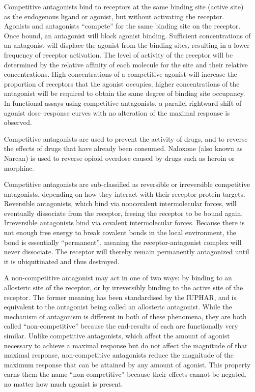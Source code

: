 Competitive antagonists bind to receptors at the same binding site (active site) as the endogenous ligand or agonist, but without activating the receptor. Agonists and antagonists ``compete'' for the same binding site on the receptor. Once bound, an antagonist will block agonist binding. Sufficient concentrations of an antagonist will displace the agonist from the binding sites, resulting in a lower frequency of receptor activation. The level of activity of the receptor will be determined by the relative affinity of each molecule for the site and their relative concentrations. High concentrations of a competitive agonist will increase the proportion of receptors that the agonist occupies, higher concentrations of the antagonist will be required to obtain the same degree of binding site occupancy. In functional assays using competitive antagonists, a parallel rightward shift of agonist dose--response curves with no alteration of the maximal response is observed.

Competitive antagonists are used to prevent the activity of drugs, and to reverse the effects of drugs that have already been consumed. Naloxone (also known as Narcan) is used to reverse opioid overdose caused by drugs such as heroin or morphine.

Competitive antagonists are sub-classified as reversible or irreversible competitive antagonists, depending on how they interact with their receptor protein targets. Reversible antagonists, which bind via noncovalent intermolecular forces, will eventually dissociate from the receptor, freeing the receptor to be bound again. Irreversible antagonists bind via covalent intermolecular forces. Because there is not enough free energy to break covalent bonds in the local environment, the bond is essentially ``permanent'', meaning the receptor-antagonist complex will never dissociate. The receptor will thereby remain permanently antagonized until it is ubiquitinated and thus destroyed.

A non-competitive antagonist may act in one of two ways: by binding to an allosteric site of the receptor, or by irreversibly binding to the active site of the receptor. The former meaning has been standardised by the IUPHAR, and is equivalent to the antagonist being called an allosteric antagonist. While the mechanism of antagonism is different in both of these phenomena, they are both called ``non-competitive'' because the end-results of each are functionally very similar. Unlike competitive antagonists, which affect the amount of agonist necessary to achieve a maximal response but do not affect the magnitude of that maximal response, non-competitive antagonists reduce the magnitude of the maximum response that can be attained by any amount of agonist. This property earns them the name ``non-competitive'' because their effects cannot be negated, no matter how much agonist is present.

